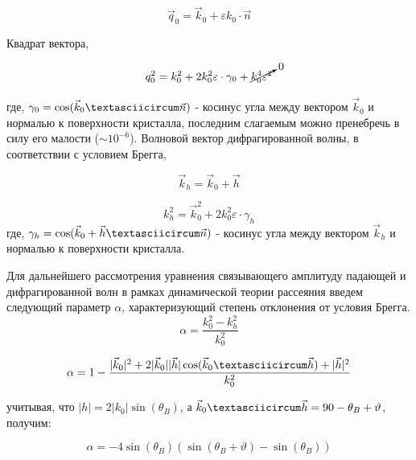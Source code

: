  \begin{equation}
   \vec{q}_0 = \vec{k}_0 + \varepsilon k_0 \cdot \vec{n}
  \end{equation}

Квадрат вектора,

\begin{equation}
   q_0^2 = k_0^2 + 2k_0^2 \varepsilon \cdot \gamma_0 + \cancelto{0}{k_0^4  \varepsilon^2}
   \label{eq:k_0_squred}
 \end{equation}

  где, $\gamma_0 = \cos(\vec{k}_0 \textasciicircum \vec{n})$ - косинус угла между вектором $\vec{k}_0$ и нормалью к поверхности кристалла,
  последним слагаемым можно пренебречь в силу его малости ($\sim 10^{-6}$).
  Волновой вектор дифрагированной волны, в соответствии с условием Брегга,

  $$\vec{k}_h = \vec{k}_0+\vec{h}$$

  \begin{equation}
     k_h^2 = \vec{k}_0^2+2k_0^2 \varepsilon \cdot \gamma_h
     \label{eq:k_h_squred}
   \end{equation}
   где, $\gamma_h = \cos(\vec{k}_0+ \vec{h} \textasciicircum \vec{n})$ - косинус угла между вектором $\vec{k}_h$ и нормалью к поверхности кристалла.

Для дальнейшего рассмотрения уравнения связывающего амплитуду падающей и дифрагированной волн в рамках
динамической теории рассеяния введем следующий параметр $\alpha$, характеризующий степень отклонения от условия Брегга.
\begin{equation}
   \alpha = \frac{k_0^2-k_h^2}{k_0^2}
   \label{eq:alpha}
\end{equation}


$$  \alpha = 1 - \frac{|\vec{k}_0|^2+2|\vec{k}_0||\vec{h}|\cos(\vec{k}_0 \textasciicircum \vec{h})+|\vec{h}|^2}{k_0^2}$$

учитывая, что $ |h| = 2|k_0| \sin(\theta_B) $, а $\vec{k}_0 \textasciicircum \vec{h} = 90-\theta_B+\vartheta$, получим:

\begin{equation}
   \alpha = -4\sin(\theta_B)(\sin(\theta_B+\vartheta)-\sin(\theta_B))
\end{equation}
